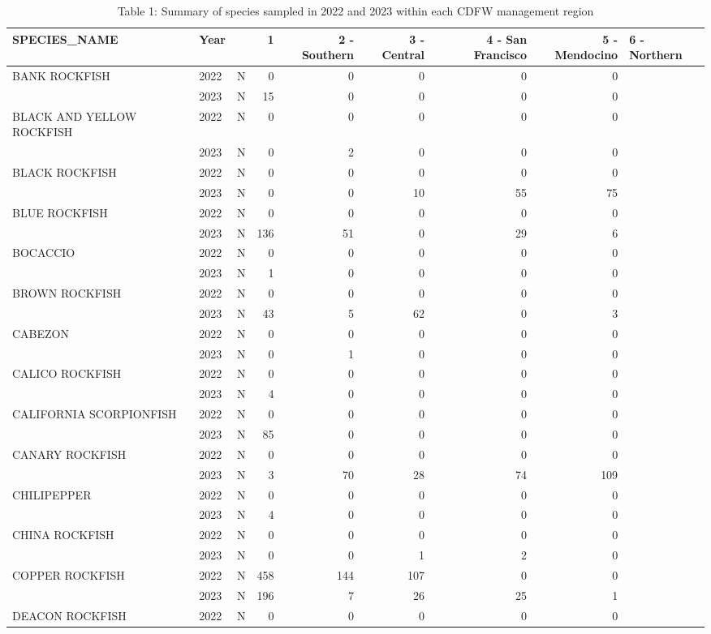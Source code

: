 \documentclass[
  letterpaper,
  DIV=11,
  numbers=noendperiod]{scrartcl}
\begin{document}
\begin{table}

\caption{Table 1: Summary of species sampled in 2022 and 2023 within each CDFW management region}
\centering
\begin{tabular}[t]{lllrrrrr}
\toprule
SPECIES\_NAME & Year &   & 1 & 2 - Southern & 3 - Central & 4 - San Francisco & 5 - Mendocino & 6 - Northern\\
\midrule
BANK ROCKFISH & 2022 & N & 0 & 0 & 0 & 0 & 0\\
 & 2023 & N & 15 & 0 & 0 & 0 & 0\\
BLACK AND YELLOW ROCKFISH & 2022 & N & 0 & 0 & 0 & 0 & 0\\
 & 2023 & N & 0 & 2 & 0 & 0 & 0\\
BLACK ROCKFISH & 2022 & N & 0 & 0 & 0 & 0 & 0\\
 & 2023 & N & 0 & 0 & 10 & 55 & 75\\
BLUE ROCKFISH & 2022 & N & 0 & 0 & 0 & 0 & 0\\
 & 2023 & N & 136 & 51 & 0 & 29 & 6\\
BOCACCIO & 2022 & N & 0 & 0 & 0 & 0 & 0\\
 & 2023 & N & 1 & 0 & 0 & 0 & 0\\
BROWN ROCKFISH & 2022 & N & 0 & 0 & 0 & 0 & 0\\
 & 2023 & N & 43 & 5 & 62 & 0 & 3\\
CABEZON & 2022 & N & 0 & 0 & 0 & 0 & 0\\
 & 2023 & N & 0 & 1 & 0 & 0 & 0\\
CALICO ROCKFISH & 2022 & N & 0 & 0 & 0 & 0 & 0\\
 & 2023 & N & 4 & 0 & 0 & 0 & 0\\
CALIFORNIA SCORPIONFISH & 2022 & N & 0 & 0 & 0 & 0 & 0\\
 & 2023 & N & 85 & 0 & 0 & 0 & 0\\
CANARY ROCKFISH & 2022 & N & 0 & 0 & 0 & 0 & 0\\
 & 2023 & N & 3 & 70 & 28 & 74 & 109\\
CHILIPEPPER & 2022 & N & 0 & 0 & 0 & 0 & 0\\
 & 2023 & N & 4 & 0 & 0 & 0 & 0\\
CHINA ROCKFISH & 2022 & N & 0 & 0 & 0 & 0 & 0\\
 & 2023 & N & 0 & 0 & 1 & 2 & 0\\
COPPER ROCKFISH & 2022 & N & 458 & 144 & 107 & 0 & 0\\
 & 2023 & N & 196 & 7 & 26 & 25 & 1\\
DEACON ROCKFISH & 2022 & N & 0 & 0 & 0 & 0 & 0\\

\end{tabular}
\end{table}
\end{document}
